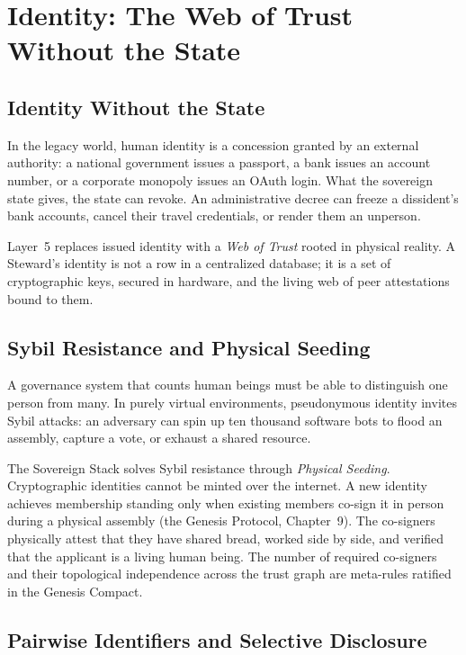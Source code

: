 \section{Identity: The Web of Trust Without the State}
\label{sec:l5-identity}

\subsection{Identity Without the State}

In the legacy world, human identity is a concession granted by an external authority: a national government issues a passport, a bank issues an account number, or a corporate monopoly issues an OAuth login. What the sovereign state gives, the state can revoke. An administrative decree can freeze a dissident's bank accounts, cancel their travel credentials, or render them an unperson.

Layer~5 replaces issued identity with a \textit{Web of Trust} rooted in physical reality. A Steward's identity is not a row in a centralized database; it is a set of cryptographic keys, secured in hardware, and the living web of peer attestations bound to them.

\subsection{Sybil Resistance and Physical Seeding}

A governance system that counts human beings must be able to distinguish one person from many. In purely virtual environments, pseudonymous identity invites Sybil attacks: an adversary can spin up ten thousand software bots to flood an assembly, capture a vote, or exhaust a shared resource.

The Sovereign Stack solves Sybil resistance through \textit{Physical Seeding}. Cryptographic identities cannot be minted over the internet. A new identity achieves membership standing only when existing members co-sign it in person during a physical assembly (the Genesis Protocol, Chapter~9). The co-signers physically attest that they have shared bread, worked side by side, and verified that the applicant is a living human being. The number of required co-signers and their topological independence across the trust graph are meta-rules ratified in the Genesis Compact.

\subsection{Pairwise Identifiers and Selective Disclosure}

